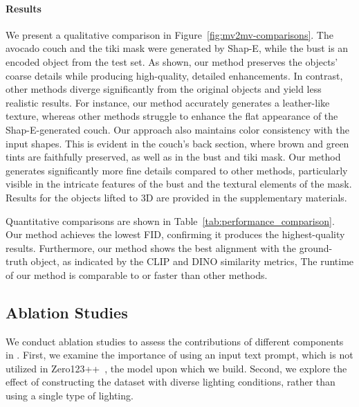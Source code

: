 \paragraph{Results}
We present a qualitative comparison in Figure~\ref{fig:mv2mv-comparisons}. The avocado couch and the tiki mask were generated by Shap-E, while the bust is an encoded object from the test set. As shown, our method preserves the objects' coarse details while producing high-quality, detailed enhancements. In contrast, other methods diverge significantly from the original objects and yield less realistic results. For instance, our method accurately generates a leather-like texture, whereas other methods struggle to enhance the flat appearance of the Shap-E-generated couch.
Our approach also maintains color consistency with the input shapes. This is evident in the couch's back section, where brown and green tints are faithfully preserved, as well as in the bust and tiki mask. Our method generates significantly more fine details compared to other methods, particularly visible in the intricate features of the bust and the textural elements of the mask. 
Results for the objects lifted to 3D are provided in the supplementary materials.

Quantitative comparisons are shown in Table~\ref{tab:performance_comparison}. Our method achieves the lowest FID, confirming it produces the highest-quality results. Furthermore, our method shows the best alignment with the ground-truth object, as indicated by the CLIP and DINO similarity metrics, The runtime of our method is comparable to or faster than other methods.



\subsection{Ablation Studies}




We conduct ablation studies to assess the contributions of different components in \ourname. 
First, we examine the importance of using an input text prompt, which is not utilized in Zero123++~\cite{shi2023zero123singleimageconsistent, xu2024instantmesh}, the model upon which we build.
Second, we explore the effect of constructing the dataset with diverse lighting conditions, rather than using a single type of lighting.


